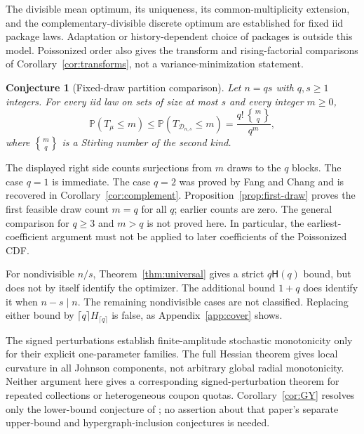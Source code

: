 \documentclass[11pt]{article}
\numberwithin{equation}{section}
\newtheorem{conjecture}[theorem]{Conjecture}
\theoremstyle{remark}
\newcommand{\Pp}{\mathbb P}
\newcommand{\1}{\mathbf 1}
\newcommand{\D}{\mathcal D}
\newcommand{\hreal}{\mathsf H}
\begin{document}
The divisible mean optimum, its uniqueness, its common-multiplicity extension, and the complementary-divisible discrete optimum are established for fixed iid package laws. Adaptation or history-dependent choice of packages is outside this model. Poissonized order also gives the transform and rising-factorial comparisons of Corollary~\ref{cor:transforms}, not a variance-minimization statement.

\begin{conjecture}[Fixed-draw partition comparison]\label{conj:fixed-draw}
Let $n=qs$ with $q,s\geq1$ integers. For every iid law on sets of size at most $s$ and every integer $m\geq0$,
\begin{equation}\label{eq:fixed-conjecture}
 \Pp(T_\mu\leq m)
 \leq\Pp(T_{\D_{n,s}}\leq m)
 =\frac{q!\,\genfrac{\{}{\}}{0pt}{}{m}{q}}{q^m},
\end{equation}
where $\genfrac{\{}{\}}{0pt}{}{m}{q}$ is a Stirling number of the second kind.
\end{conjecture}

The displayed right side counts surjections from $m$ draws to the $q$ blocks. The case $q=1$ is immediate. The case $q=2$ was proved by Fang and Chang \cite[Theorem~2]{FangChang} and is recovered in Corollary~\ref{cor:complement}. Proposition~\ref{prop:first-draw} proves the first feasible draw count $m=q$ for all $q$; earlier counts are zero. The general comparison for $q\geq3$ and $m>q$ is not proved here. In particular, the earliest-coefficient argument must not be applied to later coefficients of the Poissonized CDF.

For nondivisible $n/s$, Theorem~\ref{thm:universal} gives a strict $q\hreal(q)$ bound, but does not by itself identify the optimizer. The additional bound $1+q$ does identify it when $n-s\mid n$. The remaining nondivisible cases are not classified. Replacing either bound by $\lceil q\rceil H_{\lceil q\rceil}$ is false, as Appendix~\ref{app:cover} shows.

The signed perturbations establish finite-amplitude stochastic monotonicity only for their explicit one-parameter families. The full Hessian theorem gives local curvature in all Johnson components, not arbitrary global radial monotonicity. Neither argument here gives a corresponding signed-perturbation theorem for repeated collections or heterogeneous coupon quotas. Corollary~\ref{cor:GY} resolves only the lower-bound conjecture of \cite{GrunbaumYaakobi}; no assertion about that paper's separate upper-bound and hypergraph-inclusion conjectures is needed.
\end{document}
